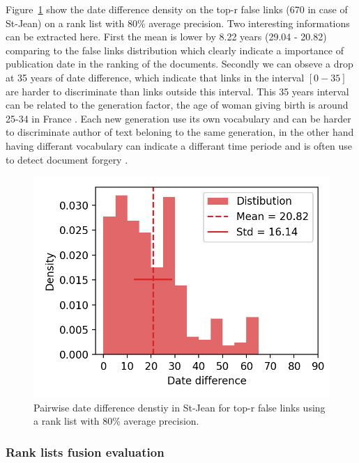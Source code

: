 Figure~\ref{fig:dates_differences_r_false} show the date difference density on the top-r false links (670 in case of St-Jean) on a rank list with 80\% average precision.
Two interesting informations can be extracted here.
First the mean is lower by 8.22 years (29.04 - 20.82) comparing to the false links distribution which clearly indicate a importance of publication date in the ranking of the documents.
Secondly we can obseve a drop at 35 years of date difference, which indicate that links in the interval $\left[0-35\right]$ are harder to discriminate than links outside this interval.
This 35 years interval can be related to the generation factor, the age of woman giving birth is around 25-34 in France \cite{generations}.
Each new generation use its own vocabulary and can be harder to discriminate author of text beloning to the same generation, in the other hand having differant vocabulary can indicate a differant time periode and is often use to detect document forgery \cite{savoy_stylo}.

\begin{figure}
  \includegraphics[width=\linewidth]{img/dates_differences_r_false.png}
  \caption{Pairwise date difference denstiy in St-Jean for top-r false links using a rank list with 80\% average precision.}
  \label{fig:dates_differences_r_false}
\end{figure}


\subsubsection{Rank lists fusion evaluation}

